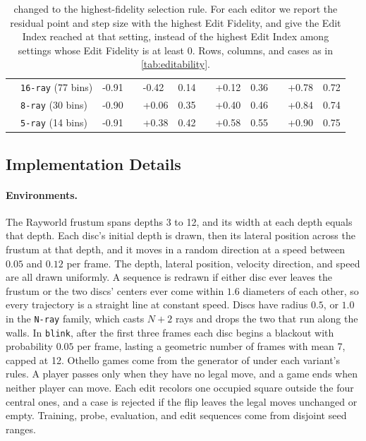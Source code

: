 \documentclass{article} %
\begin{document}
\begin{table}[ht]
\begin{tabular}{ll E G EF G EF G EF}
& \texttt{16-ray} (77 bins)    & -0.91 & & -0.42 & 0.14 & & +0.12 & 0.36 & & +0.78 & 0.72 \\
& \texttt{8-ray} (30 bins)     & -0.90 & & +0.06 & 0.35 & & +0.40 & 0.46 & & +0.84 & 0.74 \\
& \texttt{5-ray} (14 bins)     & -0.91 & & +0.38 & 0.42 & & +0.58 & 0.55 & & +0.90 & 0.75 \\
\hline
\end{tabular}
\caption{ changed to the highest-fidelity selection rule. For each editor we report the residual point and step size with the highest Edit Fidelity, and give the Edit Index reached at that setting, instead of the highest Edit Index among settings whose Edit Fidelity is at least $0$. Rows, columns, and cases as in \cref{tab:editability}.}
\label{tab:fidelity_selected}\end{table}

\FloatBarrier
\subsection{Implementation Details}
\label{app:implementation}


\paragraph{Environments.}
The Rayworld frustum spans depths 3 to 12, and its width at each depth equals that depth. Each disc's initial depth is drawn, then its lateral position across the frustum at that depth, and it moves in a random direction at a speed between $0.05$ and $0.12$ per frame. The depth, lateral position, velocity direction, and speed are all drawn uniformly. A sequence is redrawn if either disc ever leaves the frustum or the two discs' centers ever come within $1.6$ diameters of each other, so every trajectory is a straight line at constant speed. Discs have radius $0.5$, or $1.0$ in the \texttt{N-ray} family, which casts $N + 2$ rays and drops the two that run along the walls. In \texttt{blink}, after the first three frames each disc begins a blackout with probability $0.05$ per frame, lasting a geometric number of frames with mean 7, capped at 12. Othello games come from the generator of \citet{li2023othello} under each variant's rules. A player passes only when they have no legal move, and a game ends when neither player can move. Each edit recolors one occupied square outside the four central ones, and a case is rejected if the flip leaves the legal moves unchanged or empty. Training, probe, evaluation, and edit sequences come from disjoint seed ranges.
\end{document}
